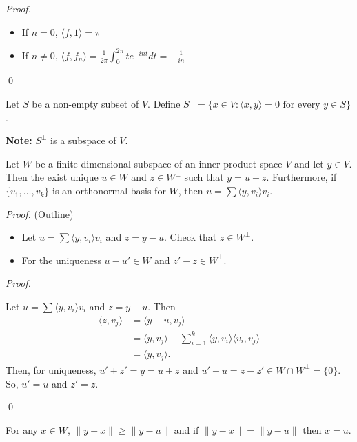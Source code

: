 \documentclass[12pt]{article}
\newenvironment{theorem}[2][Theorem]{\begin{trivlist}
\item[\hskip \labelsep {\bfseries #1}\hskip \labelsep {\bfseries #2.}]}{\end{trivlist}}
\newenvironment{corollary}[2][Corollary]{\begin{trivlist}
\item[\hskip \labelsep {\bfseries #1}\hskip \labelsep {\bfseries #2}]}{\end{trivlist}}
\newenvironment{definition}[2][Definition]{\begin{trivlist}
\item[\hskip \labelsep {\bfseries #1}\hskip \labelsep {\bfseries #2}]}{\end{trivlist}}
\newenvironment{sol}
    {\emph{Proof.}
    }
    {
    \qed
    }
\begin{document}
\begin{sol}
\begin{itemize}
    \item If $n = 0$, $\langle f, 1 \rangle = \pi$
    
    \item If $n \neq 0$, $\langle f, f_n \rangle = \frac{1}{2\pi} \int_0^{2\pi}te^{-int}dt = -\frac{1}{in}$
\end{itemize}
\end{sol}

\begin{definition}{6}
Let $S$ be a non-empty subset of $V$. Define $S^\perp = \{x \in V : \langle x, y \rangle = 0 \text{ for every } y \in S\}$.
\end{definition}

\noindent\textbf{Note:} $S^\perp$ is a subspace of $V$.

\begin{theorem}{6.6}
Let $W$ be a finite-dimensional subspace of an inner product space $V$ and let $y \in V$. Then the exist unique $u \in W$ and $z \in W^\perp$ such that $y = u + z$. Furthermore, if $\{v_1, \dots, v_k\}$ is an orthonormal basis for $W$, then $u = \sum \langle y, v_i \rangle v_i$. 
\end{theorem}

\textit{Proof.} (Outline)

\begin{itemize}
    \item Let $u = \sum \langle y, v_i \rangle v_i$ and $z = y - u$. Check that $z \in W^\perp$.
    
    \item For the uniqueness $u - u' \in W$ and $z' - z \in W^\perp$.
\end{itemize}

\begin{sol}
Let $u = \sum \langle y, v_i \rangle v_i$ and $z = y - u$. Then \begin{align*}
    \langle z, v_j \rangle &= \langle y - u, v_j \rangle \\
    &= \langle y, v_j \rangle - \sum_{i = 1}^k \langle y, v_i \rangle \langle v_i, v_j \rangle \\
    &= \langle y, v_j \rangle.
\end{align*} Then, for uniqueness, $u' + z' = y = u + z$ and $u' + u = z - z' \in W \cap W^\perp = \{0\}$. So, $u' = u$ and $z' = z$.
\end{sol}

\begin{corollary}{9}
For any $x \in W$, $\lVert y - x \rVert \geq \lVert y - u \rVert$ and if $\lVert y - x \rVert = \lVert y - u \rVert$ then $x = u$.
\end{corollary}
\end{document}
